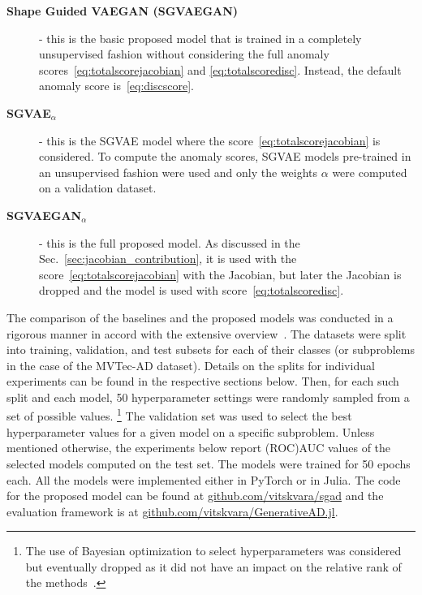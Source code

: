 \begin{description}
    \item[\textbf{Shape Guided VAEGAN (SGVAEGAN)}] - this is the basic proposed model that is trained in a completely unsupervised fashion without considering the full anomaly scores~\eqref{eq:totalscorejacobian} and \eqref{eq:totalscoredisc}. Instead, the default anomaly score is~\eqref{eq:discscore}.
    \item[\textbf{SGVAE$_{\alpha}$}] - this is the SGVAE model where the score~\eqref{eq:totalscorejacobian} is considered. To compute the anomaly scores,  SGVAE models pre-trained in an unsupervised fashion were used and only the weights $\alpha$ were computed on a validation dataset.
    \item[\textbf{SGVAEGAN$_{\alpha}$}] - this is the full proposed model. As discussed in the Sec.~\ref{sec:jacobian_contribution}, it is used with the score~\eqref{eq:totalscorejacobian} with the Jacobian, but later the Jacobian is dropped and the model is used with score~\eqref{eq:totalscoredisc}.
\end{description}

The comparison of the baselines and the proposed models was conducted in a rigorous manner in accord with the extensive overview~\cite{vskvara2021comparison}. The datasets were split into training, validation, and test subsets for each of their classes (or subproblems in the case of the MVTec-AD dataset). Details on the splits for individual experiments can be found in the respective sections below. Then, for each such split and each model, 50 hyperparameter settings were randomly sampled from a set of possible values. \footnote{The use of Bayesian optimization to select hyperparameters was considered but eventually dropped as it did not have an impact on the relative rank of the methods~\cite{vskvara2021comparison}.} The validation set was used to select the best hyperparameter values for a given model on a specific subproblem. Unless mentioned otherwise, the experiments below report (ROC)AUC values of the selected models computed on the test set. The models were trained for 50 epochs each. All the models were implemented either in PyTorch or in Julia. The code for the proposed model can be found at \url{github.com/vitskvara/sgad} and the evaluation framework is at \url{github.com/vitskvara/GenerativeAD.jl}. 
    
